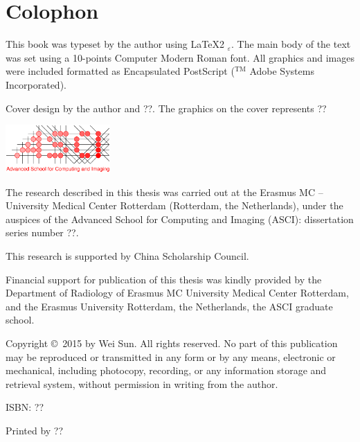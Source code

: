 %
%

\newpage
\setlength{\parindent}{0pt}
\thispagestyle{empty}

\section*{Colophon}

\bigskip

This book was typeset by the author using \LaTeX{}2{\LARGE
  $_{\varepsilon}$}. The main body of the text was set using a
10-points Computer Modern Roman font. All graphics and images were
included formatted as Encapsulated PostScript (${}^{\textrm{TM}}\!\!$
Adobe Systems Incorporated).

\bigskip

Cover design by the author and ??.
The graphics on the cover represents ??
\bigskip

\vfill
\includegraphics[width=0.3\textwidth]{logo/asci.eps}





The research described in this thesis was carried out at the Erasmus MC -- University Medical Center Rotterdam (Rotterdam, the
Netherlands), under the auspices of the Advanced School for Computing and
Imaging (ASCI): dissertation series number ??.

\bigskip

This research is supported by China Scholarship Council.


\bigskip
Financial support for publication of this thesis was kindly provided by the Department of Radiology of Erasmus MC University Medical Center Rotterdam, and the Erasmus University Rotterdam, the Netherlands, the ASCI graduate school.

\bigskip
Copyright \copyright\ 2015 by Wei Sun. All rights reserved. No
part of this publication may be reproduced or transmitted in any form
or by any means, electronic or mechanical, including photocopy,
recording, or any information storage and retrieval system, without
permission in writing from the author.

\bigskip

\bigskip

ISBN: ??


\bigskip

Printed by ??

\setlength{\parindent}{\myindent}



